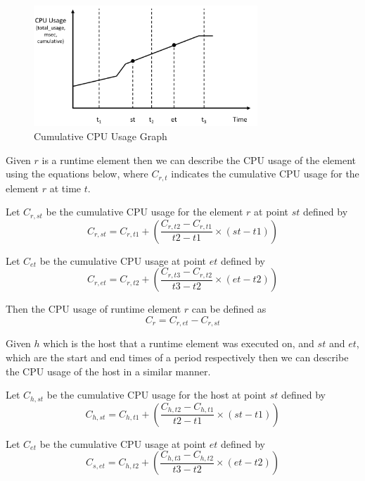 \begin{figure}
\centering
\includegraphics[width=0.75\textwidth]{Figures/estimating-energy-graph}
\caption{Cumulative CPU Usage Graph}
\label{figure:graph}
\end{figure}

Given $r$ is a runtime element then we can describe the CPU usage of the element using the equations below, where $C_{r,t}$ indicates the cumulative CPU usage for the element $r$ at time $t$.

Let $C_{r, st}$ be the cumulative CPU usage for the element $r$ at point $st$ defined by
\begin{equation}
C_{r,st} = C_{r,t1} + \left( \frac{C_{r,t2} - C_{r,t1}}{t2 - t1} \times (st - t1) \right) 
\end{equation}

Let $C_{et}$ be the cumulative CPU usage at point $et$ defined by
\begin{equation}
C_{r,et} = C_{r,t2} + \left( \frac{C_{r,t3} - C_{r,t2}}{t3 - t2} \times (et - t2) \right) 
\end{equation}

Then the CPU usage of runtime element $r$ can be defined as
\begin{equation}
C_{r} = C_{r,et} - C_{r,st}
\end{equation}

Given $h$ which is the host that a runtime element was executed on, and $st$ and $et$, which are the start and end times of a period respectively then we can describe the CPU usage of the host in a similar manner.

Let $C_{h, st}$ be the cumulative CPU usage for the host at point $st$ defined by
\begin{equation}
C_{h,st} = C_{h,t1} + \left( \frac{C_{h,t2} - C_{h,t1}}{t2 - t1} \times (st - t1) \right) 
\end{equation}

Let $C_{et}$ be the cumulative CPU usage at point $et$ defined by
\begin{equation}
C_{s,et} = C_{h,t2} + \left( \frac{C_{h,t3} - C_{h,t2}}{t3 - t2} \times (et - t2) \right) 
\end{equation}

